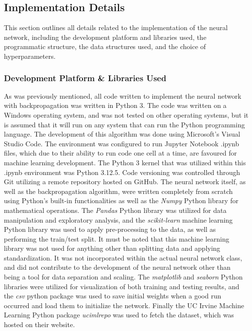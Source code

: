 \documentclass[a4paper]{article}
\begin{document}
\subsection{Implementation Details}

This section outlines all details related to the implementation of the neural network, including the development platform and libraries used, the programmatic structure, the data structures used, and the choice of hyperparameters.

\subsubsection{Development Platform \& Libraries Used}

As was previously mentioned, all code written to implement the neural network with backpropagation was written in Python 3. The code was written on a Windows operating system, and was not tested on other operating systems, but it is assumed that it will run on any system that can run the Python programming language. The development of this algorithm was done using Microsoft's Visual Studio Code. The environment was configured to run Jupyter Notebook .ipynb files, which due to their ability to run code one cell at a time, are favoured for machine learning development. The Python 3 kernel that was utilized within this .ipynb environment was Python 3.12.5. Code versioning was controlled through Git utilizing a remote repository hosted on GitHub. The neural network itself, as well as the backpropagation algorithm, were written completely from scratch using Python's built-in functionalities as well as the \textit{Numpy} Python library for mathematical operations. The \textit{Pandas} Python library was utilized for data manipulation and exploratory analysis, and the \textit{scikit-learn} machine learning Python library was used to apply pre-processing to the data, as well as performing the train/test split. It must be noted that this machine learning library was not used for anything other than splitting data and applying standardization. It was not incorporated within the actual neural network class, and did not contribute to the development of the neural network other than being a tool for data separation and scaling. The \textit{matplotlib} and \textit{seaborn} Python libraries were utilized for visualization of both training and testing results, and the \textit{csv} python package was used to save initial weights when a good run occurred and load them to initialize the network. Finally the UC Irvine Machine Learning Python package \textit{ucimlrepo} was used to fetch the dataset, which was hosted on their website. 
\end{document}
